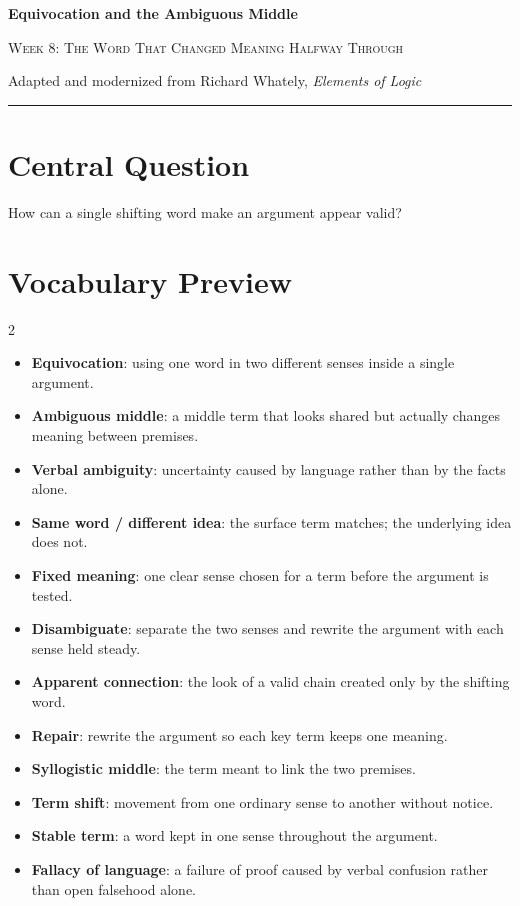 \documentclass[12pt]{article}
\begin{document}
\begin{center}
{\LARGE\bfseries Equivocation and the Ambiguous Middle}\par\vspace{0.25em}
{\large\scshape Week 8: The Word That Changed Meaning Halfway Through}\par\vspace{0.5em}
{Adapted and modernized from Richard Whately, \textit{Elements of Logic}}\par\vspace{0.6em}
\rule{0.82\textwidth}{0.4pt}
\end{center}

\section*{Central Question}
How can a single shifting word make an argument appear valid?

\section*{Vocabulary Preview}
\begin{multicols}{2}
\begin{itemize}[leftmargin=*, itemsep=0.18em]
\item \textbf{Equivocation}: using one word in two different senses inside a single argument.
\item \textbf{Ambiguous middle}: a middle term that looks shared but actually changes meaning between premises.
\item \textbf{Verbal ambiguity}: uncertainty caused by language rather than by the facts alone.
\item \textbf{Same word / different idea}: the surface term matches; the underlying idea does not.
\item \textbf{Fixed meaning}: one clear sense chosen for a term before the argument is tested.
\item \textbf{Disambiguate}: separate the two senses and rewrite the argument with each sense held steady.
\item \textbf{Apparent connection}: the look of a valid chain created only by the shifting word.
\item \textbf{Repair}: rewrite the argument so each key term keeps one meaning.
\item \textbf{Syllogistic middle}: the term meant to link the two premises.
\item \textbf{Term shift}: movement from one ordinary sense to another without notice.
\item \textbf{Stable term}: a word kept in one sense throughout the argument.
\item \textbf{Fallacy of language}: a failure of proof caused by verbal confusion rather than open falsehood alone.
\end{itemize}
\end{multicols}
\end{document}
